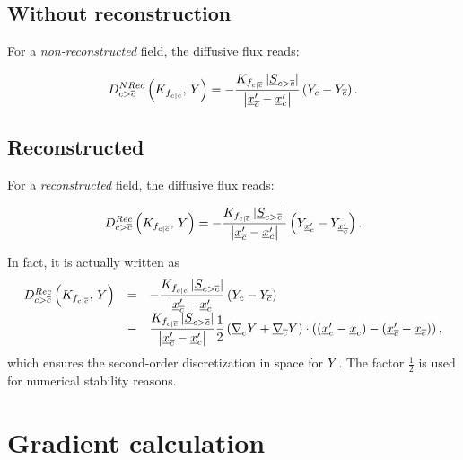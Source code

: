 \subsection{Without reconstruction}
For a \emph{non-reconstructed} field, the diffusive flux reads:

\begin{equation}
D_{{c > {\overline{c}}}}^{NRec} \left( K_{{{f}_{c|{\overline{c}}}}} , \, Y \right)  =  - \dfrac{K_{{{f}_{c|{\overline{c}}}}} \left| \underline{S}_{{c > {\overline{c}}}} \right|}{\left| \underline{x}_{{\overline{c}}}^\prime - \underline{x}_{c}^\prime \right| } \left( Y_{c} - Y_{{\overline{c}}}\right).
\end{equation}


\subsection{Reconstructed}
For a \emph{reconstructed} field, the diffusive flux reads:

\begin{equation}
D_{{c > {\overline{c}}}}^{Rec} \left( K_{{{f}_{c|{\overline{c}}}}} , \, Y \right)  =  - \dfrac{K_{{{f}_{c|{\overline{c}}}}} \left| \underline{S}_{{c > {\overline{c}}}} \right|}{\left| \underline{x}_{{\overline{c}}}^\prime - \underline{x}_{c}^\prime \right| } \left( Y_{\underline{x}_{c}^\prime} - Y_{\underline{x}_{{\overline{c}}}^\prime} \right).
\end{equation}

\begin{remark}
In fact, it is actually written as
%
\begin{equation}
\begin{array}{r c l}
D_{{c > {\overline{c}}}}^{Rec} \left( K_{{{f}_{c|{\overline{c}}}}} , \, Y \right)  &=&  - \dfrac{K_{{{f}_{c|{\overline{c}}}}} \left| \underline{S}_{{c > {\overline{c}}}} \right|}{\left| \underline{x}_{{\overline{c}}}^\prime - \underline{x}_{c}^\prime \right| } \left( Y_{c} - Y_{{\overline{c}}} \right) \\
&-& \dfrac{K_{{{f}_{c|{\overline{c}}}}} \left| \underline{S}_{{c > {\overline{c}}}} \right|}{\left| \underline{x}_{{\overline{c}}}^\prime - \underline{x}_{c}^\prime \right| }  \dfrac{1}{2}\left( \underline{\nabla}_{c} Y + \underline{\nabla}_{{\overline{c}}} Y \right) \cdot \left( \left(\underline{x}_{c}^\prime - {\underline{x}_{c}}\right) - \left(\underline{x}_{{\overline{c}}}^\prime - \underline{x}_{{\overline{c}}}\right) \right),
\end{array}
\end{equation}
%
which ensures the second-order discretization in space for $Y$.
The factor $ \frac{1}{2}$ is used for numerical stability reasons.
\end{remark}


\section{Gradient calculation}

